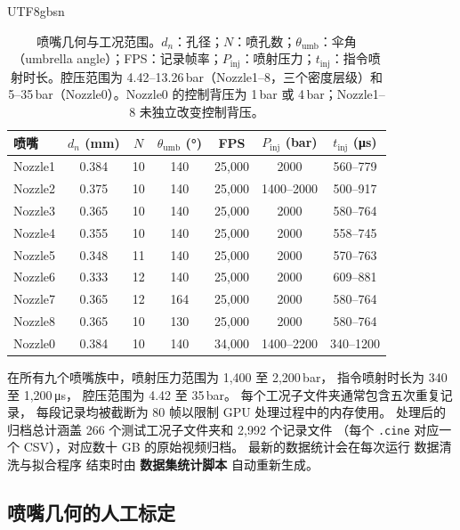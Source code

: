\documentclass[english, 12pt, a4paper, elec, utf8, a-2b, online]{aaltothesis}
\begin{document}
\begin{CJK*}{UTF8}{gbsn}
\begin{table}[t]
\centering
\footnotesize
\setlength{\tabcolsep}{4pt}
\renewcommand{\arraystretch}{1.1}
\begin{tabular}{@{}lcccccc@{}}
\toprule
喷嘴 & $d_n$ (mm) & $N$ & $\theta_{\mathrm{umb}}$ (°) & FPS & $P_{\mathrm{inj}}$ (bar) & $t_{\mathrm{inj}}$ (\si{\micro s}) \\
\midrule
Nozzle1 & 0.384 & 10 & 140 & 25{,}000 & 2000          & 560--779   \\
Nozzle2 & 0.375 & 10 & 140 & 25{,}000 & 1400--2000    & 500--917   \\
Nozzle3 & 0.365 & 10 & 140 & 25{,}000 & 2000          & 580--764   \\
Nozzle4 & 0.355 & 10 & 140 & 25{,}000 & 2000          & 558--745   \\
Nozzle5 & 0.348 & 11 & 140 & 25{,}000 & 2000          & 570--763   \\
Nozzle6 & 0.333 & 12 & 140 & 25{,}000 & 2000          & 609--881   \\
Nozzle7 & 0.365 & 12 & 164 & 25{,}000 & 2000          & 580--764   \\
Nozzle8 & 0.365 & 10 & 130 & 25{,}000 & 2000          & 580--764   \\
Nozzle0   & 0.384 & 10 & 140 & 34{,}000 & 1400--2200    & 340--1200  \\
\bottomrule
\end{tabular}
\caption{喷嘴几何与工况范围。$d_n$：孔径；$N$：喷孔数；$\theta_{\mathrm{umb}}$：伞角（umbrella angle）；FPS：记录帧率；$P_{\mathrm{inj}}$：喷射压力；$t_{\mathrm{inj}}$：指令喷射时长。腔压范围为 4.42--13.26\,bar（Nozzle1--8，三个密度层级）和 5--35\,bar（Nozzle0）。Nozzle0 的控制背压为 1\,bar 或 4\,bar；Nozzle1--8 未独立改变控制背压。}
\label{tab:nozzle-overview}
\end{table}

在所有九个喷嘴族中，喷射压力范围为 1,400 至 2,200\,bar，
指令喷射时长为 340 至 1,200\,\si{\micro s}，
腔压范围为 4.42 至 35\,bar。
每个工况子文件夹通常包含五次重复记录，
每段记录均被截断为 80 帧以限制 GPU 处理过程中的内存使用。
处理后的归档总计涵盖 266 个测试工况子文件夹和 2,992 个记录文件
（每个 \texttt{.cine} 对应一个 CSV），对应数十 GB 的原始视频归档。
最新的数据统计会在每次运行 数据清洗与拟合程序 结束时由 \textbf{数据集统计脚本} 自动重新生成。

\subsection{喷嘴几何的人工标定}


\end{CJK*}
\end{document}
